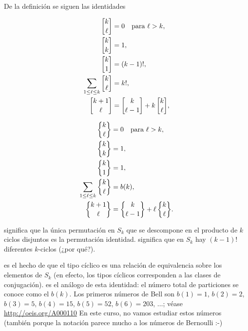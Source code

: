 \documentclass{article}
\numberwithin{equation}{section}
\theoremstyle{definition}
\begin{document}
De la definición se siguen las identidades

\begin{align}
  \label{eqn:stirling-I-0} \stirling{k}{\ell} & = 0 \quad\text{para }\ell > k,\\
  \label{eqn:stirling-I-1} \stirling{k}{k} & = 1,\\
  \label{eqn:stirling-I-2} \stirling{k}{1} & = (k-1)!,\\
  \label{eqn:stirling-I-3} \sum_{1 \le \ell \le k} \stirling{k}{\ell} & = k!,\\
  \label{eqn:stirling-I-recur} \stirling{k+1}{\ell} & = \stirling{k}{\ell-1} + k\,\stirling{k}{\ell},
\end{align}

\begin{align}
  \label{eqn:stirling-II-0} \Stirling{k}{\ell} & = 0 \quad\text{para }\ell > k,\\
  \label{eqn:stirling-II-1} \Stirling{k}{k} & = 1,\\
  \label{eqn:stirling-II-2} \Stirling{k}{1} & = 1,\\
  \label{eqn:stirling-II-3} \sum_{1 \le \ell \le k} \Stirling{k}{\ell} & = b (k),\\
  \label{eqn:stirling-II-recur} \Stirling{k+1}{\ell} & = \Stirling{k}{\ell-1} + \ell\,\Stirling{k}{\ell}.
\end{align}

 significa que la única permutación en $S_k$ que
se descompone en el producto de $k$ ciclos disjuntos es la permutación
identidad.  significa que en $S_k$ hay $(k-1)!$
diferentes $k$-ciclos (¿por qué?).

 es el hecho de que el tipo cíclico es una relación
de equivalencia sobre los elementos de $S_k$ (en efecto, los tipos cíclicos
corresponden a las clases de conjugación).  es
el análogo de esta identidad: el número total de particiones se conoce como
el  $b (k)$. Los primeros números de Bell son $b (1) = 1$,
$b (2) = 2$, $b (3) = 5$, $b (4) = 15$, $b (5) = 52$, $b (6) = 203$, $\ldots$;
véase \url{http://oeis.org/A000110} En este curso, no vamos estudiar estos
números (también porque la notación parece mucho a los números de Bernoulli :-)
\end{document}
